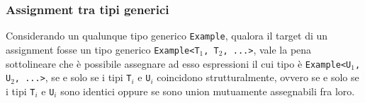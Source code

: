 \subsubsection{Assignment tra tipi generici}
Considerando un qualunque tipo generico \texttt{Example}, qualora il target di un assignment fosse un 
tipo generico \texttt{Example<T$_1$, T$_2$, ...>}, vale la pena sottolineare che è possibile assegnare 
ad esso espressioni il cui tipo è \texttt{Example<U$_1$, U$_2$, ...>}, se e solo se i tipi \texttt{T$_i$} e 
\texttt{U$_i$} coincidono strutturalmente, ovvero se e solo se i tipi \texttt{T$_i$} e 
\texttt{U$_i$} sono identici oppure se sono union mutuamente assegnabili fra loro. \\